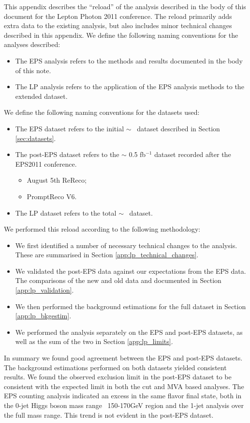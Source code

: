 
This appendix describes the ``reload'' of the analysis described in the body
of this document for the Lepton Photon 2011 conference.
The reload primarily adds extra data to the existing analysis, but also 
includes minor technical changes described in this appendix.
We define the following naming conventions for the analyses described:

\begin{itemize}
    \item The EPS analysis refers to the methods and results documented in the body of this note.
    \item The LP analysis refers to the application of the EPS analysis methods to the extended dataset.
\end{itemize}

We define the following naming conventions for the datasets used:

\begin{itemize}
    \item The EPS dataset refers to the initial $\sim$ \intlumi~dataset described in Section \ref{sec:datasets}.
    \item The post-EPS dataset refers to the $\sim$ 0.5 fb$^{-1}$ dataset recorded after the EPS2011 conference.
    \begin{itemize}
        \item August 5th ReReco;
        \item PromptReco V6.
    \end{itemize}
    \item The LP dataset refers to the total $\sim$ \lpintlumi~dataset.
\end{itemize}

We performed this reload according to the following methodology:

\begin{itemize}
    \item We first identified a number of necessary technical changes to the analysis.  
These are summarised in Section \ref{app:lp_technical_changes}.
    \item We validated the post-EPS data against our expectations from the EPS data.
The comparisons of the new and old data and documented in Section \ref{app:lp_validation}.
    \item We then performed the background estimations for the full dataset in Section \ref{app:lp_bkgestim}.
    \item We performed the analysis separately on the EPS and post-EPS datasets, 
as well as the sum of the two in Section \ref{app:lp_limits}.
\end{itemize}

In summary we found good agreement between the EPS and post-EPS datasets.  
The background estimations performed on both datasets yielded consistent results.
We found the observed exclusion limit in the post-EPS dataset to be consistent
with the expected limit in both the cut and MVA based analyses.
The EPS counting analysis indicated an excess in the same flavor final state, 
both in the 0-jet Higgs boson mass range ~150-170GeV region 
and the 1-jet analysis over the full mass range.
This trend is not evident in the post-EPS dataset.

